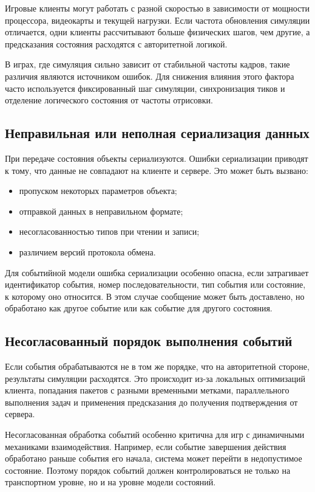 Игровые клиенты могут работать с разной скоростью в зависимости от мощности процессора, видеокарты и текущей нагрузки. Если частота обновления симуляции отличается, одни клиенты рассчитывают больше физических шагов, чем другие, а предсказания состояния расходятся с авторитетной логикой.

В играх, где симуляция сильно зависит от стабильной частоты кадров, такие различия являются источником ошибок. Для снижения влияния этого фактора часто используется фиксированный шаг симуляции, синхронизация тиков и отделение логического состояния от частоты отрисовки.

\subsection{Неправильная или неполная сериализация данных}

При передаче состояния объекты сериализуются. Ошибки сериализации приводят к тому, что данные не совпадают на клиенте и сервере. Это может быть вызвано:
\begin{itemize}
	\item пропуском некоторых параметров объекта;
	\item отправкой данных в неправильном формате;
	\item несогласованностью типов при чтении и записи;
	\item различием версий протокола обмена.
\end{itemize}

Для событийной модели ошибка сериализации особенно опасна, если затрагивает идентификатор события, номер последовательности, тип события или состояние, к которому оно относится. В этом случае сообщение может быть доставлено, но обработано как другое событие или как событие для другого состояния.

\subsection{Несогласованный порядок выполнения событий}

Если события обрабатываются не в том же порядке, что на авторитетной стороне, результаты симуляции расходятся. Это происходит из-за локальных оптимизаций клиента, попадания пакетов с разными временными метками, параллельного выполнения задач и применения предсказания до получения подтверждения от сервера.

Несогласованная обработка событий особенно критична для игр с динамичными механиками взаимодействия. Например, если событие завершения действия обработано раньше события его начала, система может перейти в недопустимое состояние. Поэтому порядок событий должен контролироваться не только на транспортном уровне, но и на уровне модели состояний.

